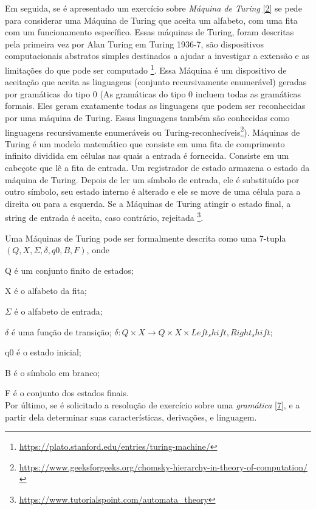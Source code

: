 \documentclass[
	12pt,				%
	openright,			%
	twoside,			%
	a4paper,			%
	english,			%
	french,				%
	spanish,			%
	brazil,				%
	]{abntex2}
\begin{document}
Em seguida, se é apresentado um exercício sobre  \emph{Máquina de Turing} \ref{2} se pede para considerar uma Máquina de Turing que aceita um alfabeto, com uma fita com um funcionamento específico.
Essas máquinas de Turing, foram descritas pela primeira vez por Alan Turing em Turing 1936-7, são dispositivos computacionais abstratos simples destinados a ajudar a investigar a extensão e as limitações do que pode ser computado \footnote{\url{https://plato.stanford.edu/entries/turing-machine/}}. Essa Máquina é um dispositivo de aceitação que aceita as linguagens (conjunto recursivamente enumerável) geradas por gramáticas do tipo 0 (As gramáticas do tipo 0 incluem todas as gramáticas formais. Eles geram exatamente todas as linguagens que podem ser reconhecidas por uma máquina de Turing. Essas linguagens também são conhecidas como linguagens recursivamente enumeráveis ou Turing-reconhecíveis\footnote{\url{https://www.geeksforgeeks.org/chomsky-hierarchy-in-theory-of-computation/}}).
Máquinas de Turing é um modelo matemático que consiste em uma fita de comprimento infinito dividida em células nas quais a entrada é fornecida. Consiste em um cabeçote que lê a fita de entrada. Um registrador de estado armazena o estado da máquina de Turing. Depois de ler um símbolo de entrada, ele é substituído por outro símbolo, seu estado interno é alterado e ele se move de uma célula para a direita ou para a esquerda. Se a Máquinas de Turing  atingir o estado final, a string de entrada é aceita, caso contrário, rejeitada \footnote{\url{https://www.tutorialspoint.com/automata_theory}}.

Uma Máquinas de Turing pode ser formalmente descrita como uma 7-tupla $(Q, X, \Sigma, \delta,  q0, B, F)$, onde

    \textsf{Q} é um conjunto finito de estados;

    \textsf{X} é o alfabeto da fita;

    \textsf{$\Sigma$} é o alfabeto de entrada;

    \textsf{$\delta$} é uma função de transição; $\delta: Q \times X \rightarrow Q \times X \times {Left_shift, Right_shift}$;

    \textsf{q0} é o estado inicial;

    \textsf{B} é o símbolo em branco;

    \textsf{F} é o conjunto dos estados finais.\\


Por último, se é solicitado a resolução de exercício sobre uma \emph{gramática} \ref{7}, e a partir dela determinar suas características, derivações, e linguagem.
\end{document}
